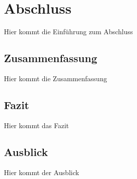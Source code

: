 \chapter{Abschluss}

Hier kommt die Einführung zum Abschluss

\section{Zusammenfassung}

Hier kommt die Zusammenfassung

\section{Fazit}

Hier kommt das Fazit

\section{Ausblick}

Hier kommt der Ausblick

